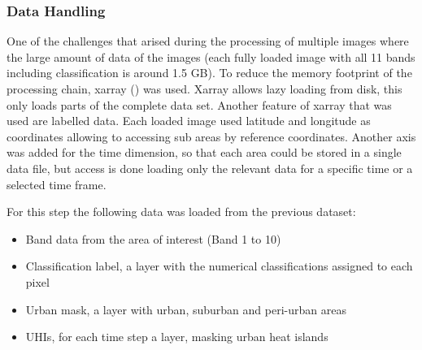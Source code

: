 \documentclass[12pt,a4paper, english]{article}
\begin{document}
    \subsubsection{Data Handling}
      One of the challenges that arised during the processing of multiple images where the large amount of data of the images (each fully loaded image with all 11 bands including classification is around 1.5 GB).
      To reduce the memory footprint of the processing chain, xarray (\autocite{hoyer2017xarray}) was used. 
      Xarray allows lazy loading from disk, this only loads parts of the complete data set. 
      Another feature of xarray that was used are labelled data. Each loaded image used latitude and longitude as coordinates allowing to accessing sub areas by reference coordinates. 
      Another axis was added for the time dimension, so that each area could be stored in a single data file, but access is done loading only the relevant data for a specific time or a selected time frame.
  
      For this step the following data was loaded from the previous dataset: 
      \begin{itemize}
        \item Band data from the area of interest (Band 1 to 10)
        \item Classification label, a layer with the numerical classifications assigned to each pixel 
        \item Urban mask, a layer with urban, suburban and peri-urban areas
        \item \glspl{UHI}, for each time step a layer, masking urban heat islands
      \end{itemize}
\end{document}
